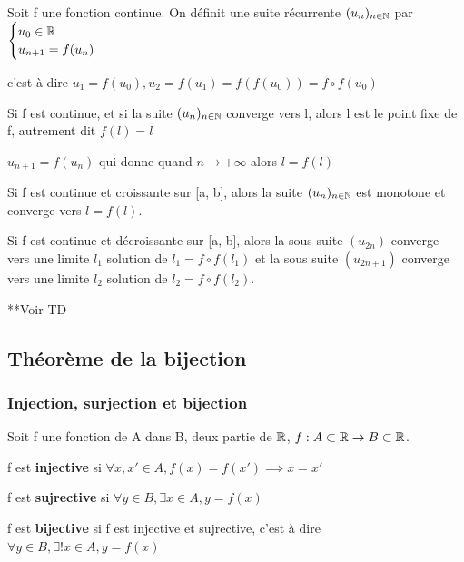\documentclass[a4paper, 12pt]{article}
\begin{document}
Soit f une fonction continue. On définit une suite récurrente $(u_n)_{n \in \mathbb{N}}$ par $\begin{cases}u_0 \in \mathbb{R} \\ u_{n+1} = f(u_n)\end{cases}$

c'est à dire $u_1 = f(u_0), u_2 = f(u_1) = f(f(u_0)) = f \circ f(u_0)$

\begin{theorem}
    Si f est continue, et si la suite $(u_n)_{n \in \mathbb{N}}$ converge vers l, alors l est le point fixe de f,
    autrement dit $f(l) = l$
\end{theorem}

\begin{demonstration}
    $u_{n+1} = f(u_n)$ qui donne quand $n \to +\infty$ alors $l = f(l)$
\end{demonstration}

\begin{proprietes}
    \item Si f est continue et croissante sur [a, b], alors la suite $(u_n)_{n \in \mathbb{N}}$ est monotone et converge vers $l = f(l)$.
    \item Si f est continue et décroissante sur [a, b], alors la sous-suite $(u_{2n})$ converge vers une limite $l_1$ solution
    de $l_1 = f \circ f(l_1)$ et la sous suite $(u_{2n + 1})$ converge vers une limite $l_2$ solution de $l_2 = f \circ f(l_2)$.
\end{proprietes}

\begin{demonstration}
    **Voir TD
\end{demonstration}

\subsection{Théorème de la bijection}

\subsubsection{Injection, surjection et bijection}

\begin{definition}
    Soit f une fonction de A dans B, deux partie de $\mathbb{R}$, $f: A \subset \mathbb{R} \rightarrow B \subset \mathbb{R}$.

    \item f est \textbf{injective} si $\forall x, x' \in A, f(x) = f(x') \implies x = x'$
    \item f est \textbf{sujrective} si $\forall y \in B, \exists x \in A, y = f(x)$
    \item f est \textbf{bijective} si f est injective et sujrective, c'est à dire $\forall y \in B, \exists! x \in A, y = f(x)$
\end{definition}
\end{document}
